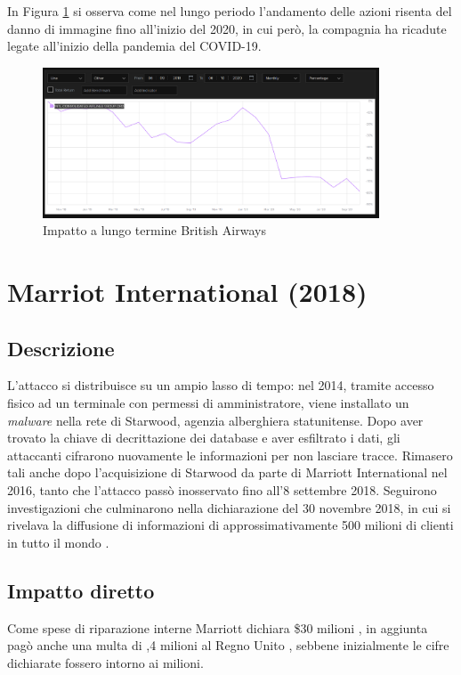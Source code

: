 \documentclass[12pt,a4paper,twoside]{report}
\begin{document}
In Figura \ref{fig:britair2} \cite{lse_britair} si osserva come nel lungo periodo l'andamento delle azioni risenta del danno di immagine fino all'inizio del 2020, in cui per\`o, la compagnia ha ricadute legate all'inizio della pandemia del COVID-19.\\

\begin{figure}[H] 
\begin{center} 
\includegraphics[width=10cm]{figures/britAir_long.png} 
\caption[Grafico British Airways long]{Impatto a lungo termine  British Airways}\label{fig:britair2}
\end{center}
\end{figure}

\section{Marriot International (2018)}
\subsection{Descrizione}
L'attacco si distribuisce su un ampio lasso di tempo: nel 2014, tramite accesso fisico ad un terminale con permessi di amministratore, viene installato un \textit{malware} nella rete di Starwood, agenzia alberghiera statunitense. Dopo aver trovato la chiave di decrittazione dei database e aver esfiltrato i dati, gli attaccanti cifrarono nuovamente le informazioni per non lasciare tracce. Rimasero tali anche dopo l'acquisizione di Starwood da parte di Marriott International nel 2016, tanto che l'attacco pass\`o  inosservato fino all'8 settembre 2018. Seguirono investigazioni che culminarono nella dichiarazione del 30 novembre 2018, in cui si rivelava la diffusione di informazioni di approssimativamente 500 milioni di clienti in tutto il mondo \cite{Marriott_ResGate}\cite{Marriott_customer_perception}.\\ 
\subsection{Impatto diretto}
Come spese di riparazione interne Marriott dichiara \$30 milioni \cite{Marriott_ResGate}, in aggiunta pag\`o anche una multa di ,4 milioni al Regno Unito \cite{Marriott_actual_fine}, sebbene  inizialmente le cifre dichiarate fossero intorno ai  milioni.\\ 
\end{document}
